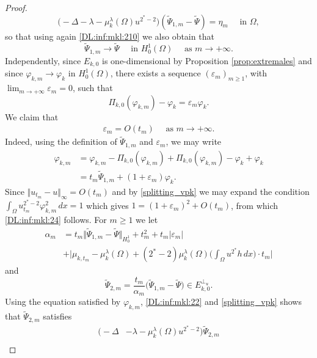 \documentclass[10pt]{amsart}
\numberwithin{equation}{section}
\newcommand{\ve}{\varepsilon}
\newcommand{\vp}{\varphi}
\newcommand{\Om}{\Omega}
\newcommand{\mkl}{\mu_{k}^{\lambda}}
\theoremstyle{plain}
\theoremstyle{remark}
\begin{document}
\begin{proof}
$$\big( - \Delta - \lambda - \mkl(\Om) u^{2^*-2} \big)(\tilde{\Psi}_{1,m} - \tilde{\Psi}) = \eta_m \quad \text{ in } \Om ,$$
so that using again \eqref{DL:inf:mkl:210} we also obtain that 
\begin{equation} \label{DL:inf:mkl:23}
\tilde{\Psi}_{1,m} \to \tilde{\Psi} \quad \text{ in } H^1_0(\Om) \quad \text{ as } m \to + \infty.
\end{equation}
 Independently, since $E_{k,0}$ is one-dimensional by Proposition \ref{prop:extremales} and since $\vp_{k,m} \to \vp_k$ in $H^1_0(\Om)$, there exists a sequence $(\ve_m)_{m \ge1}$, with $\lim_{m \to + \infty} \ve_m = 0$, such that 
$$\Pi_{k,0}(\vp_{k,m}) - \vp_k = \ve_m \vp_k.$$
 We claim that 
\begin{equation} \label{DL:inf:mkl:24}
\begin{aligned}
\ve_m = O(t_m) \quad \text{ as } m \to + \infty. 
\end{aligned} 
\end{equation}
Indeed, using the definition of $\tilde{\Psi}_{1,m}$ and $\ve_m$, we may write 
\begin{equation} \label{splitting_vpk}\begin{aligned}
 \vp_{k,m} & = \vp_{k,m} - \Pi_{k,0}(\vp_{k,m}) +  \Pi_{k,0}(\vp_{k,m}) - \vp_k + \vp_k \\
 &= t_m \tilde{\Psi}_{1,m} + (1+\ve_m) \vp_k .
 \end{aligned}
 \end{equation}
Since $\Vert u_{t_m} - u \Vert_{\infty} = O(t_m)$ and by \eqref{splitting_vpk} we may expand the condition $\int_{\Om} u_{t_m}^{2^*-2} \vp_{k,m}^2 \, dx = 1$ which gives $1  = (1+\ve_m)^2 + O(t_m)$, from which \eqref{DL:inf:mkl:24} follows. For $m \ge 1$ we  let 
$$ \begin{aligned}
\alpha_m &= t_m \big \Vert \tilde{\Psi}_{1,m} - \tilde{\Psi} \big \Vert_{H^1_0} + t_m^2 + t_m |\ve_m| \\
& + \Big| \mu_{k,t_m} - \mkl(\Om) + (2^*-2)\mkl(\Om) \Big( \int_{\Om} u^{2^*}h \, dx\Big) \cdot t_m\Big|
\end{aligned} $$
and 
$$ \tilde{\Psi}_{2,m} = \frac{t_m}{\alpha_m} \Big( \tilde{\Psi}_{1,m} - \tilde{\Psi} \Big) \in E_{k,0}^{\perp_u}. $$
Using the equation satisfied by $\vp_{k,m}$, \eqref{DL:inf:mkl:22} and \eqref{splitting_vpk} shows that $\tilde{\Psi}_{2,m}$ satisfies
\begin{equation} \label{DL:inf:mkl:25}
\begin{aligned}
 \big( - \Delta & - \lambda - \mkl(\Om) u^{2^*-2} \big)\tilde{\Psi}_{2,m}\\

\end{aligned}
\end{equation}
\end{proof}
\end{document}
